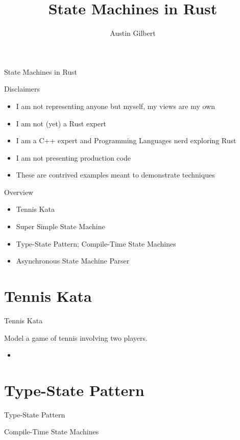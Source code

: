 \documentclass[aspectratio=169]{beamer}
\title{State Machines in Rust}
\author{Austin Gilbert}
\begin{document}
\begin{frame}
\begin{center}
\begin{Huge}
State Machines in Rust
\end{Huge}
\end{center}
\end{frame}

\begin{frame}{Disclaimers}
\begin{itemize}
\item I am not representing anyone but myself, my views are my own
\item I am not (yet) a Rust expert
\item I am a C++ expert and Programming Languages nerd exploring Rust
\item I am not presenting production code
\item These are contrived examples meant to demonstrate techniques
\end{itemize}
\end{frame}

\begin{frame}{Overview}
\begin{itemize}
\item Tennis Kata
\item Super Simple State Machine
\item Type-State Pattern; Compile-Time State Machines
\item Asynchronous State Machine Parser
\end{itemize}
\end{frame}

\section{Tennis Kata}
\begin{frame}{Tennis Kata}

Model a game of tennis involving two players.
\begin{itemize}
\item 
\end{itemize}
\end{frame}


\section{Type-State Pattern}
\begin{frame}
\begin{center}
\begin{Huge}
Type-State Pattern
\end{Huge}
\linebreak
\linebreak
\begin{Large}
Compile-Time State Machines
\end{Large}
\end{center}
\end{frame}
\end{document}
